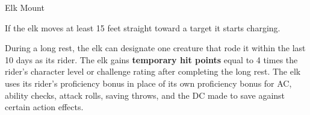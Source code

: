 \documentclass[letterpaper,twocolumn,openany,nodeprecatedcode]{dndbook}
\begin{document}
\begin{DndMonster}[float*=b,width=\textwidth + 8pt]{Elk Mount}
  \begin{multicols}{2}

    \DndMonsterBasics[
        armor-class = {10 + PB},
        hit-points  = {\DndDice{2d10 + 2}},
        speed       = {50 ft.},
      ]

    \DndMonsterAbilityScores[
        str = 16,
        dex = 10,
        con = 12,
        int = 2,
        wis = 10,
        cha = 6,
      ]

    \DndMonsterDetails[
        senses = {passive Perception 9},
        languages = {-},
        challenge = 1/4,
      ]

    If the elk moves at least 15 feet straight toward a target it starts charging.

    During a long rest, the elk can designate one creature that rode it within the last 10 days as its rider. The elk gains \textbf{temporary hit points} equal to 4 times the rider’s character level or challenge rating after completing the long rest. The elk uses its rider’s proficiency bonus in place of its own proficiency bonus for AC, ability checks, attack rolls, saving throws, and the DC made to save against certain action effects.


    \DndMonsterAttack[
      name=Combat Ram,
      distance=melee, %
      mod={+3 + PB},
      dmg=\DndDice{1d6 + 3},
      dmg-type=bludgeoning,
      or-dmg=\DndDice{3d6 + 3},
      or-dmg-when={if the elk is charging on the same turn.},
      extra={ If the target is a Large or smaller creature, it must succeed on a DC 11 + PB Strength saving throw or be knocked prone}
    ]


\end{multicols}
\end{DndMonster}
\end{document}
